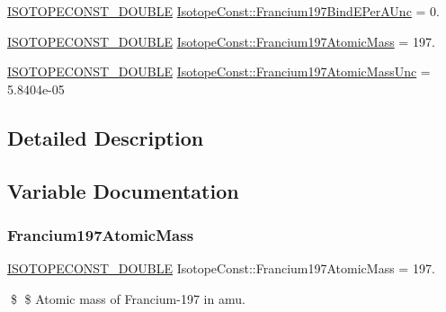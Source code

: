 \begin{DoxyCompactItemize}
\mbox{\hyperlink{group___isotope_const-_macros_ga8f45a7272ce02c0b4c65c44636ed719a}{I\+S\+O\+T\+O\+P\+E\+C\+O\+N\+S\+T\+\_\+\+D\+O\+U\+B\+LE}} \mbox{\hyperlink{group___isotope_const-_francium-_fr197_ga82d4b4fcf6ceb13c59879f37750beb53}{Isotope\+Const\+::\+Francium197\+Bind\+E\+Per\+A\+Unc}} = 0.
\item 
\mbox{\hyperlink{group___isotope_const-_macros_ga8f45a7272ce02c0b4c65c44636ed719a}{I\+S\+O\+T\+O\+P\+E\+C\+O\+N\+S\+T\+\_\+\+D\+O\+U\+B\+LE}} \mbox{\hyperlink{group___isotope_const-_francium-_fr197_gabe9f0e52ba7948b23128fe2f5bd7e57a}{Isotope\+Const\+::\+Francium197\+Atomic\+Mass}} = 197.
\item 
\mbox{\hyperlink{group___isotope_const-_macros_ga8f45a7272ce02c0b4c65c44636ed719a}{I\+S\+O\+T\+O\+P\+E\+C\+O\+N\+S\+T\+\_\+\+D\+O\+U\+B\+LE}} \mbox{\hyperlink{group___isotope_const-_francium-_fr197_ga87d086b5556576797305da3692b3ab3e}{Isotope\+Const\+::\+Francium197\+Atomic\+Mass\+Unc}} = 5.\+8404e-\/05
\end{DoxyCompactItemize}


\subsection{Detailed Description}


\subsection{Variable Documentation}
\mbox{\label{group___isotope_const-_francium-_fr197_gabe9f0e52ba7948b23128fe2f5bd7e57a}} 
\subsubsection{\texorpdfstring{Francium197\+Atomic\+Mass}{Francium197AtomicMass}}
{\footnotesize\ttfamily \mbox{\hyperlink{group___isotope_const-_macros_ga8f45a7272ce02c0b4c65c44636ed719a}{I\+S\+O\+T\+O\+P\+E\+C\+O\+N\+S\+T\+\_\+\+D\+O\+U\+B\+LE}} Isotope\+Const\+::\+Francium197\+Atomic\+Mass = 197.}

\$ \$ Atomic mass of Francium-\/197 in amu. \mbox{\label{group___isotope_const-_francium-_fr197_ga87d086b5556576797305da3692b3ab3e}} 

